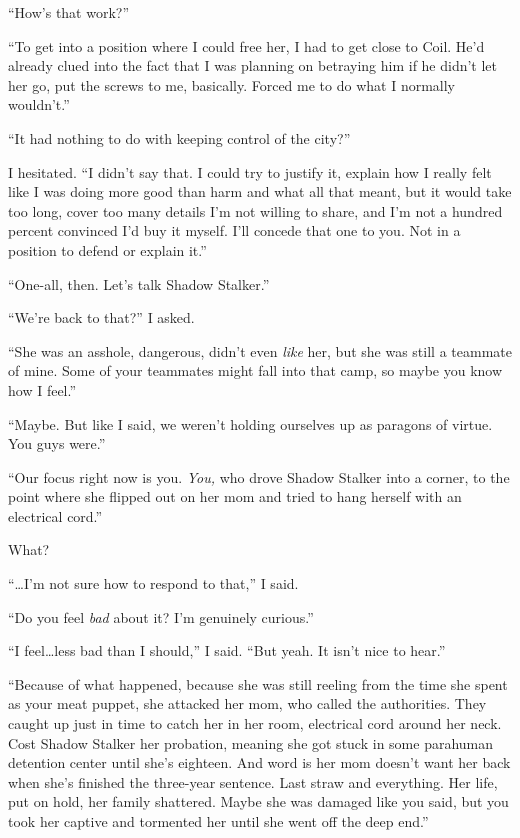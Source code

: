 ``How's that work?''



``To get into a position where I could free her, I had to get close to Coil.  He'd already clued into the fact that I was planning on betraying him if he didn't let her go, put the screws to me, basically.  Forced me to do what I normally wouldn't.''



``It had nothing to do with keeping control of the city?''



I hesitated.  ``I didn't say that.  I could try to justify it, explain how I really felt like I was doing more good than harm and what all that meant, but it would take too long, cover too many details I'm not willing to share, and I'm not a hundred percent convinced I'd buy it myself.  I'll concede that one to you.  Not in a position to defend or explain it.''



``One-all, then.  Let's talk Shadow Stalker.''



``We're back to that?''  I asked.



``She was an asshole, dangerous, didn't even \emph{like} her, but she was still a teammate of mine.  Some of your teammates might fall into that camp, so maybe you know how I feel.''



``Maybe.  But like I said, we weren't holding ourselves up as paragons of virtue.  You guys were.''



``Our focus right now is you.  \emph{You, }who drove Shadow Stalker into a corner, to the point where she flipped out on her mom and tried to hang herself with an electrical cord.''



What?



``\ldots{}I'm not sure how to respond to that,'' I said.



``Do you feel \emph{bad} about it?  I'm genuinely curious.''



``I feel\ldots less bad than I should,'' I said.  ``But yeah.  It isn't nice to hear.''



``Because of what happened, because she was still reeling from the time she spent as your meat puppet, she attacked her mom, who called the authorities.  They caught up just in time to catch her in her room, electrical cord around her neck.  Cost Shadow Stalker her probation, meaning she got stuck in some parahuman detention center until she's eighteen.  And word is her mom doesn't want her back when she's finished the three-year sentence.  Last straw and everything.  Her life, put on hold, her family shattered.  Maybe she was damaged like you said, but you took her captive and tormented her until she went off the deep end.''



